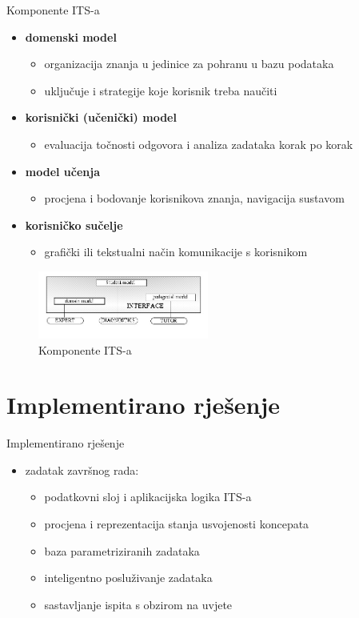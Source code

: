 \documentclass[times, utf8, numeric]{beamer}
\begin{document}
\begin{frame}{Komponente ITS-a}
\begin{itemize}
	\item \textbf{domenski model}
	\begin{itemize}
		\item organizacija znanja u jedinice za pohranu u bazu podataka
		\item uključuje i strategije koje korisnik treba naučiti
	\end{itemize}
	\item \textbf{korisnički (učenički) model}
	\begin{itemize}
		\item evaluacija točnosti odgovora i analiza zadataka korak po korak
	\end{itemize}
	\item \textbf{model učenja}
	\begin{itemize}
		\item procjena i bodovanje korisnikova znanja, navigacija sustavom
	\end{itemize}
	\item \textbf{korisničko sučelje}
	\begin{itemize}
		\item grafički ili tekstualni način komunikacije s korisnikom
	\end{itemize}
\end{itemize}
		\begin{figure}[komp]
			\centering
			\includegraphics[width=0.5\textwidth,height=0.5\textheight,keepaspectratio]{img/ITS-components.jpg}
			\caption{Komponente ITS-a}
			\label{fig:its}
		\end{figure}
\end{frame}

\section{Implementirano rješenje}
\begin{frame}{Implementirano rješenje}
\begin{itemize}
	\item zadatak završnog rada:
	\begin{itemize}
		\item podatkovni sloj i aplikacijska logika ITS-a
		\item procjena i reprezentacija stanja usvojenosti koncepata
		\item baza parametriziranih zadataka
		\item inteligentno posluživanje zadataka
		\item sastavljanje ispita s obzirom na uvjete
	\end{itemize}
\end{itemize}
\end{frame}
\end{document}
